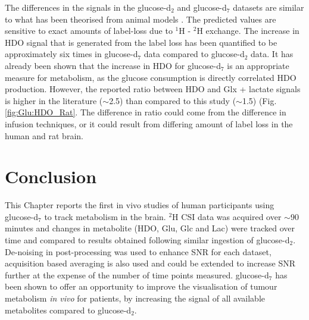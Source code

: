 The differences in the signals in the glucose-d$_2$ and glucose-d$_7$ datasets are similar to what has been theorised from animal models \cite{Mahar2021DeuteratedGlucose}. The predicted values are sensitive to exact amounts of label-loss due to $^1$H - $^2$H exchange. The increase in \ac{HDO} signal that is generated from the label loss has been quantified to be approximately six times in glucose-d$_7$ data compared to glucose-d$_2$ data. It has already been shown that the increase in \ac{HDO} for glucose-d$_7$ is an appropriate measure for metabolism, as the glucose consumption is directly correlated HDO production. However, the reported ratio between \ac{HDO} and Glx + lactate signals is higher in the literature ($\sim$2.5) than compared to this study ($\sim$1.5) (Fig. \ref{fig:Glu:HDO_Rat}. The difference in ratio could come from the difference in infusion techniques, or it could result from differing amount of label loss in the human and rat brain.


\section{Conclusion}

This Chapter reports the first in vivo studies of human participants using glucose-d$_7$ to track metabolism in the brain. $^2$H \ac{CSI} data was acquired over $\sim$90 minutes and changes in metabolite (\ac{HDO}, Glu, Glc and Lac) were tracked over time and compared to results obtained following similar ingestion of glucose-d$_2$. De-noising in post-processing was used to enhance \ac{SNR} for each dataset, acquisition based averaging is also used and could be extended to increase \ac{SNR} further at the expense of the number of time points measured. glucose-d$_7$ has been shown to offer an opportunity to improve the visualisation of tumour metabolism \textit{in vivo} for patients, by increasing the signal of all available metabolites compared to glucose-d$_2$. 